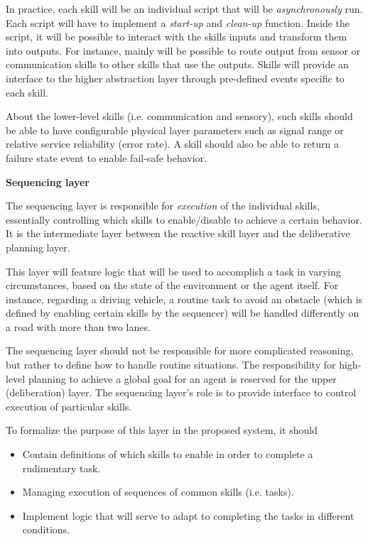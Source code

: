 \documentclass[0main.tex]{subfiles}
\begin{document}
In practice, each skill will be an individual script that will be \emph{asynchronously} run.
Each script will have to implement a \emph{start-up} and \emph{clean-up} function.
Inside the script, it will be possible to interact with the skills inputs and transform them into 
outputs. For instance, mainly will be possible to route output from sensor or communication skills
to other skills that use the outputs. Skills will provide an interface to the higher abstraction layer 
through pre-defined events specific to each skill.

About the lower-level skills (i.e. communication and sensory), such skills should be 
able to have configurable physical layer parameters such as signal range or relative service
reliability (error rate). A skill should also be able to return a
failure state event to enable fail-safe behavior. \pagebreak

\textbf{Sequencing layer}

The sequencing layer is responsible for \emph{execution} of the individual skills, essentially 
controlling which skills to enable/disable to achieve a certain behavior. It is the 
intermediate layer between the reactive skill layer and the deliberative planning layer. 

This layer will feature logic that will be used to accomplish a task in varying circumstances, 
based on the state of the environment or the agent itself. For instance, regarding a driving 
vehicle, a routine task to avoid an obstacle (which is defined by enabling certain skills by
the sequencer) will be handled differently on a road with more than two lanes.

The sequencing layer should not be responsible for more complicated reasoning, but rather 
to define how to handle routine situations. The responsibility for high-level planning to achieve 
a global goal for an agent is reserved for the upper (deliberation) layer. The sequencing layer's 
role is to provide interface to control execution of particular skills.

To formalize the purpose of this layer in the proposed system, it should 

\begin{itemize}
    \item Contain definitions of which skills to enable in order to complete a rudimentary task.
    \item Managing execution of sequences of common skills (i.e. tasks).
    \item Implement logic that will serve to adapt to completing the tasks in different conditions.
\end{itemize}
\end{document}
